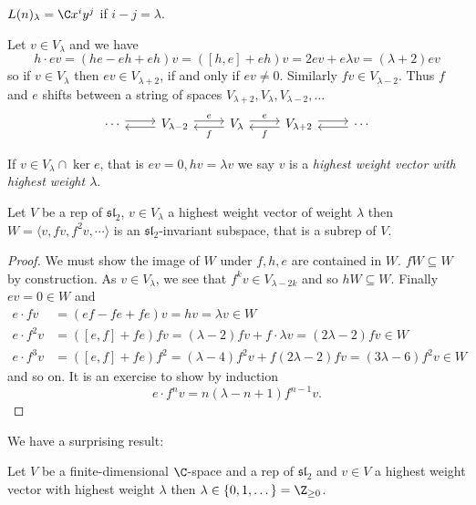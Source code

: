 \documentclass[a4paper]{article}
\newcommand*{\Lie}[1]{\mathfrak{#1}} %
\begin{document}
\begin{eg}
  \(L(n)_\lambda = \C x^i y^j\) if \(i - j = \lambda\).
\end{eg}

Let \(v \in V_\lambda\) and we have
\[
  h \cdot ev = (he - eh + eh) v = ([h, e] + eh) v = 2ev + e \lambda v = (\lambda + 2) ev
\]
so if \(v \in V_\lambda\) then \(ev \in V_{\lambda + 2}\), if and only if \(ev \neq 0\). Similarly \(fv \in V_{\lambda - 2}\). Thus \(f\) and \(e\) shifts between a string of spaces \(V_{\lambda + 2}, V_\lambda, V_{\lambda - 2}, \dots\)
\[
  \begin{tikzcd}
    \cdots \ar[r,  shift left] & V_{\lambda - 2} \ar[l, shift left] \ar[r, "e", shift left] & V_\lambda \ar[l, "f", shift left] \ar[r, "e", shift left] & V_{\lambda + 2} \ar[l, "f", shift left] \ar[r, shift left] & \cdots \ar[l, shift left]
  \end{tikzcd}
\]

If \(v \in V_\lambda \cap \ker e\), that is \(ev = 0, hv = \lambda v\) we say \(v\) is a \emph{highest weight vector with highest weight \(\lambda\)}.

\begin{lemma}
  Let \(V\) be a rep of \(\Lie{sl}_2\), \(v \in V_\lambda\) a highest weight vector of weight \(\lambda\) then \(W = \langle v, fv, f^2v, \cdots \rangle\) is an \(\Lie{sl}_2\)-invariant subspace, that is a subrep of \(V.\)
\end{lemma}

\begin{proof}
  We must show the image of \(W\) under \(f, h, e\) are contained in \(W\). \(fW \subseteq W\) by construction. As \(v \in V_\lambda\), we see that \(f^kv \in V_{\lambda - 2k}\) and so \(hW \subseteq W\). Finally \(ev = 0 \in W\) and
  \begin{align*}
    e \cdot fv &= (ef - fe + fe) v = hv = \lambda v \in W \\
    e \cdot f^2 v &= ([e, f] + fe) fv = (\lambda - 2) fv + f\cdot \lambda v = (2\lambda - 2) fv \in W \\
    e \cdot f^3 v &= ([e, f] + fe) f^2 = (\lambda - 4) f^2v + f(2\lambda - 2) fv = (3\lambda - 6)f^2 v \in W
  \end{align*}
  and so on. It is an exercise to show by induction
  \[
    e\cdot f^n v = n (\lambda - n + 1) f^{n - 1} v.
  \]
\end{proof}

We have a surprising result:
\begin{lemma}
  Let \(V\) be a finite-dimensional \(\C\)-space and a rep of \(\Lie{sl}_2\) and \(v \in V\) a highest weight vector with highest weight \(\lambda\) then \(\lambda \in \{0, 1, \dots \} = \Z_{\geq 0}\).
\end{lemma}
\end{document}

